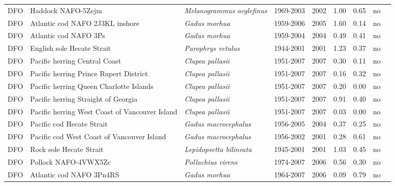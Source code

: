 \begin{longtable}{p{1.8cm}p{4cm}p{4cm}ccccp{1.9cm}c}
  DFO & Haddock NAFO-5Zejm & \textit{Melanogrammus aeglefinus} & 1969-2003 & 2002 & 1.00 & 0.65 & no & \cite{DFO-HAD5Zejm-1969-2003-PREFONTAINE} \\ 
  DFO & Atlantic cod NAFO 2J3KL inshore & \textit{Gadus morhua} & 1959-2006 & 2005 & 1.60 & 0.14 & no & \cite{DFO-NFLD-COD2J3KLIS-1959-2006-PREFONTAINE} \\ 
  DFO & Atlantic cod NAFO 3Ps & \textit{Gadus morhua} & 1959-2004 & 2004 & 0.49 & 0.41 & no & \cite{DFO-NFLD-COD3Ps-1959-2004-PREFONTAINE} \\ 
  DFO & English sole Hecate Strait & \textit{Parophrys vetulus} & 1944-2001 & 2001 & 1.23 & 0.37 & no & \cite{DFO-PAC-ESOLEHS-1944-2001-COLLIE} \\ 
  DFO & Pacific herring Central Coast & \textit{Clupea pallasii} & 1951-2007 & 2007 & 0.30 & 0.11 & no & \cite{DFO-PAC-HERRCC-1951-2007-COLLIE} \\ 
  DFO & Pacific herring Prince Rupert District & \textit{Clupea pallasii} & 1951-2007 & 2007 & 0.16 & 0.32 & no & \cite{DFO-PAC-HERRPRD-1951-2007-COLLIE} \\ 
  DFO & Pacific herring Queen Charlotte Islands & \textit{Clupea pallasii} & 1951-2007 & 2007 & 0.20 & 0.00 & no & \cite{DFO-PAC-HERRQCI-1951-2007-COLLIE} \\ 
  DFO & Pacific herring Straight of Georgia & \textit{Clupea pallasii} & 1951-2007 & 2007 & 0.91 & 0.40 & no & \cite{DFO-PAC-HERRSOG-1951-2007-COLLIE} \\ 
  DFO & Pacific herring West Coast of Vancouver Island & \textit{Clupea pallasii} & 1951-2007 & 2007 & 0.03 & 0.00 & no & \cite{DFO-PAC-HERRWCVANI-1951-2007-COLLIE} \\ 
  DFO & Pacific cod Hecate Strait & \textit{Gadus macrocephalus} & 1956-2005 & 2004 & 0.37 & 0.25 & no & \cite{DFO-PAC-PCODHS-1956-2005-COLLIE} \\ 
  DFO & Pacific cod West Coast of Vancouver Island & \textit{Gadus macrocephalus} & 1956-2002 & 2001 & 0.28 & 0.61 & no & \cite{DFO-PAC-PCODWCVANI-1956-2002-COLLIE} \\ 
  DFO & Rock sole Hecate Strait & \textit{Lepidopsetta bilineata} & 1945-2001 & 2001 & 1.03 & 0.45 & no & \cite{DFO-PAC-RSOLEHSTR-1945-2001-COLLIE} \\ 
  DFO & Pollock NAFO-4VWX5Zc & \textit{Pollachius virens} & 1974-2007 & 2006 & 0.56 & 0.30 & no & \cite{DFO-POLL4VWX5Zc-1974-2007-PREFONTAINE} \\ 
  DFO & Atlantic cod NAFO 3Pn4RS & \textit{Gadus morhua} & 1964-2007 & 2006 & 0.09 & 0.79 & no & \cite{DFO-QUE-COD3Pn4RS-1964-2007-PREFONTAINE} \\ 

\end{longtable}

